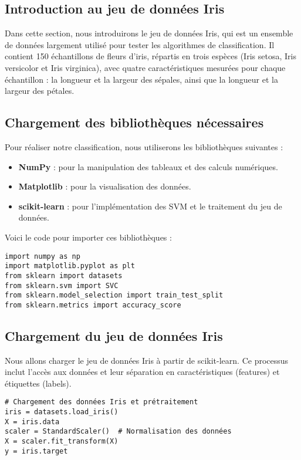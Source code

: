 \documentclass{article}
\begin{document}
\subsection{Introduction au jeu de données Iris}
Dans cette section, nous introduirons le jeu de données Iris, qui est un
ensemble de données largement utilisé pour tester les algorithmes de 
classification. Il contient 150 échantillons de fleurs d'iris, répartis 
en trois espèces (Iris setosa, Iris versicolor et Iris virginica), avec 
quatre caractéristiques mesurées pour chaque échantillon : la longueur et 
la largeur des sépales, ainsi que la longueur et la largeur des pétales.
\subsection{Chargement des bibliothèques nécessaires}

Pour réaliser notre classification, nous utiliserons les bibliothèques suivantes :

\begin{itemize}
    \item \textbf{NumPy} : pour la manipulation des tableaux et des calculs numériques.
    \item \textbf{Matplotlib} : pour la visualisation des données.
    \item \textbf{scikit-learn} : pour l'implémentation des SVM et le traitement du jeu de données.
\end{itemize}

Voici le code pour importer ces bibliothèques :

\begin{verbatim}
import numpy as np
import matplotlib.pyplot as plt
from sklearn import datasets
from sklearn.svm import SVC
from sklearn.model_selection import train_test_split
from sklearn.metrics import accuracy_score
\end{verbatim}

\subsection{Chargement du jeu de données Iris}
Nous allons charger le jeu de données Iris à partir de scikit-learn. Ce 
processus inclut l'accès aux données et leur séparation en 
caractéristiques (features) et étiquettes (labels).
\begin{verbatim}
# Chargement des données Iris et prétraitement
iris = datasets.load_iris()
X = iris.data
scaler = StandardScaler()  # Normalisation des données
X = scaler.fit_transform(X)
y = iris.target
\end{verbatim}
\end{document}

